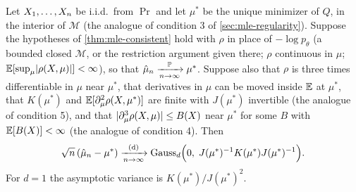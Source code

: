 \begin{theorem}
\label{thm:mest-normal}
Let $X_1, \ldots, X_n$ be i.i.d.\ from $\Pr$ and let $\mu^*$ be the unique minimizer of $Q$, in the interior of $\mathcal{M}$ (the analogue of condition 3 of \cref{sec:mle-regularity}).
Suppose the hypotheses of \cref{thm:mle-consistent} hold with $\rho$ in place of $-\log p_\theta$ (a bounded closed $\mathcal{M}$, or the restriction argument given there; $\rho$ continuous in $\mu$; $\operatorname*{\mathbb{E}}[\sup_\mu\lvert\rho(X, \mu)\rvert] < \infty$), so that $\hat{\mu}_n \xrightarrow [n \to \infty ]{\mathbb{P}} \mu^*$.
Suppose also that $\rho$ is three times differentiable in $\mu$ near $\mu^*$, that derivatives in $\mu$ can be moved inside $\operatorname*{\mathbb{E}}$ at $\mu^*$, that $K(\mu^*)$ and $\operatorname*{\mathbb{E}}[\partial^2_\mu\rho(X, \mu^*)]$ are finite with $J(\mu^*)$ invertible (the analogue of condition 5), and that $\lvert\partial^3_\mu\rho(X, \mu)\rvert \leq B(X)$ near $\mu^*$ for some $B$ with $\operatorname*{\mathbb{E}}[B(X)] < \infty$ (the analogue of condition 4).
Then
\[
\sqrt{n}\,(\hat{\mu}_n - \mu^*) \xrightarrow [n \to \infty ]{\text{(d)}} \text{Gauss}_d\Big(0,\; J(\mu^*)^{-1}K(\mu^*)J(\mu^*)^{-1}\Big).
\]
For $d = 1$ the asymptotic variance is $K(\mu^*)/J(\mu^*)^2$.
\end{theorem}


